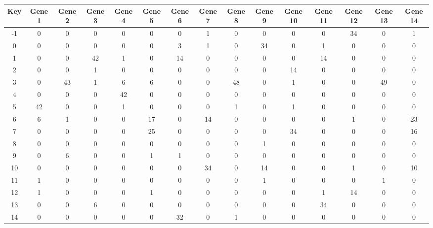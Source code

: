 \begin{tabular}{|c|c|c|c|c|c|c|c|c|c|c|c|c|c|c|}
\hline
Key & Gene 1 & Gene 2 & Gene 3 & Gene 4 & Gene 5 & Gene 6 & Gene 7 & Gene 8 & Gene 9 & Gene 10 & Gene 11 & Gene 12 & Gene 13 & Gene 14 \\
\hline
-1 & 0 & 0 & 0 & 0 & 0 & 0 & 1 & 0 & 0 & 0 & 0 & 34 & 0 & 1 \\
0 & 0 & 0 & 0 & 0 & 0 & 3 & 1 & 0 & 34 & 0 & 1 & 0 & 0 & 0 \\
1 & 0 & 0 & 42 & 1 & 0 & 14 & 0 & 0 & 0 & 0 & 14 & 0 & 0 & 0 \\
2 & 0 & 0 & 1 & 0 & 0 & 0 & 0 & 0 & 0 & 14 & 0 & 0 & 0 & 0 \\
3 & 0 & 43 & 1 & 6 & 6 & 0 & 0 & 48 & 0 & 1 & 0 & 0 & 49 & 0 \\
4 & 0 & 0 & 0 & 42 & 0 & 0 & 0 & 0 & 0 & 0 & 0 & 0 & 0 & 0 \\
5 & 42 & 0 & 0 & 1 & 0 & 0 & 0 & 1 & 0 & 1 & 0 & 0 & 0 & 0 \\
6 & 6 & 1 & 0 & 0 & 17 & 0 & 14 & 0 & 0 & 0 & 0 & 1 & 0 & 23 \\
7 & 0 & 0 & 0 & 0 & 25 & 0 & 0 & 0 & 0 & 34 & 0 & 0 & 0 & 16 \\
8 & 0 & 0 & 0 & 0 & 0 & 0 & 0 & 0 & 1 & 0 & 0 & 0 & 0 & 0 \\
9 & 0 & 6 & 0 & 0 & 1 & 1 & 0 & 0 & 0 & 0 & 0 & 0 & 0 & 0 \\
10 & 0 & 0 & 0 & 0 & 0 & 0 & 34 & 0 & 14 & 0 & 0 & 1 & 0 & 10 \\
11 & 1 & 0 & 0 & 0 & 0 & 0 & 0 & 0 & 1 & 0 & 0 & 0 & 1 & 0 \\
12 & 1 & 0 & 0 & 0 & 1 & 0 & 0 & 0 & 0 & 0 & 1 & 14 & 0 & 0 \\
13 & 0 & 0 & 6 & 0 & 0 & 0 & 0 & 0 & 0 & 0 & 34 & 0 & 0 & 0 \\
14 & 0 & 0 & 0 & 0 & 0 & 32 & 0 & 1 & 0 & 0 & 0 & 0 & 0 & 0 \\
\hline
\end{tabular}